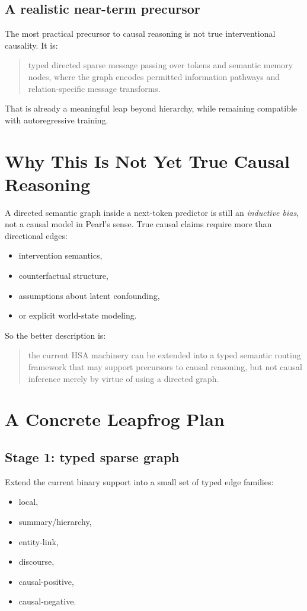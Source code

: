 \documentclass[11pt]{article}
\begin{document}
\subsection{A realistic near-term precursor}

The most practical precursor to causal reasoning is not true interventional
causality. It is:
\begin{quote}
typed directed sparse message passing over tokens and semantic memory nodes,
where the graph encodes permitted information pathways and relation-specific
message transforms.
\end{quote}

That is already a meaningful leap beyond hierarchy, while remaining compatible
with autoregressive training.

\section{Why This Is Not Yet True Causal Reasoning}

A directed semantic graph inside a next-token predictor is still an
\emph{inductive bias}, not a causal model in Pearl's sense. True causal claims
require more than directional edges:
\begin{itemize}[leftmargin=1.5em]
    \item intervention semantics,
    \item counterfactual structure,
    \item assumptions about latent confounding,
    \item or explicit world-state modeling.
\end{itemize}

So the better description is:
\begin{quote}
the current HSA machinery can be extended into a typed semantic routing
framework that may support precursors to causal reasoning, but not causal
inference merely by virtue of using a directed graph.
\end{quote}

\section{A Concrete Leapfrog Plan}

\subsection{Stage 1: typed sparse graph}

Extend the current binary support into a small set of typed edge families:
\begin{itemize}[leftmargin=1.5em]
    \item local,
    \item summary/hierarchy,
    \item entity-link,
    \item discourse,
    \item causal-positive,
    \item causal-negative.
\end{itemize}
\end{document}
